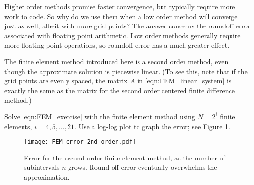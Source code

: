 \begin{problem}
\label{prob:FEM_accuracy_comparison}
Higher order methods promise faster convergence, but typically require more work to code.
So why do we use them when a low order method will converge just as well, albeit with more grid points?
The answer concerns the roundoff error associated with floating point arithmetic.
Low order methods generally require more floating point operations, so roundoff error has a much greater effect.

The finite element method introduced here is a second order method, even though the approximate solution is piecewise linear.
(To see this, note that if the grid points are evenly spaced, the matrix $A$ in \eqref{eqn:FEM_linear_system} is exactly the same as the matrix for the second order centered finite difference method.)

Solve \eqref{eqn:FEM_exercise} with the finite element method using $N = 2^i$  finite elements, $i = 4, 5, \ldots, 21$.
Use a log-log plot to graph the error; see Figure \ref{fig:FEM_error_2nd_order}.
\end{problem}


\begin{figure}[ht]
\centering
\texttt{[image: FEM\_error\_2nd\_order.pdf]}
\caption{Error for the second order finite element method, as the number of subintervals $n$ grows. Round-off error eventually overwhelms the approximation. }
\label{fig:FEM_error_2nd_order}
\end{figure}
\newpage
